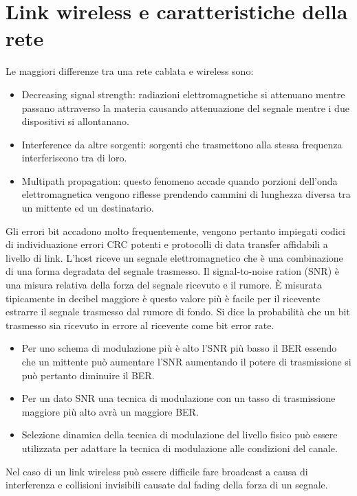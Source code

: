\section{Link wireless e caratteristiche della rete}
Le maggiori differenze tra una rete cablata e wireless sono:
\begin{itemize}
\item Decreasing signal strength: radiazioni elettromagnetiche si attenuano mentre passano attraverso la materia causando attenuazione del segnale mentre i due dispositivi si allontanano.
\item Interference da altre sorgenti: sorgenti che trasmettono alla stessa frequenza interferiscono tra di loro. 
\item Multipath propagation: questo fenomeno accade quando porzioni dell'onda elettromagnetica vengono riflesse prendendo cammini di lunghezza diversa tra un mittente ed un destinatario.
\end{itemize}
Gli errori bit accadono molto frequentemente, vengono pertanto impiegati codici di individuazione errori CRC potenti e protocolli di data transfer affidabili a livello di link. L'host riceve un segnale 
elettromagnetico che \`e una combinazione di una forma degradata del segnale trasmesso. Il signal-to-noise ration (SNR) \`e una misura relativa della forza del segnale ricevuto e il rumore. \`E misurata 
tipicamente in decibel maggiore \`e questo valore pi\`u \`e facile per il ricevente estrarre il segnale trasmesso dal rumore di fondo. Si dice la probabilit\`a che un bit trasmesso sia ricevuto in errore al ricevente
come bit error rate.
\begin{itemize}
\item Per uno schema di modulazione pi\`u \`e alto l'SNR pi\`u basso il BER essendo che un mittente pu\`o aumentare l'SNR aumentando il potere di trasmissione si pu\`o pertanto diminuire il BER. 
\item Per un dato SNR una tecnica di modulazione con un tasso di trasmissione maggiore pi\`u alto avr\`a un maggiore BER. 
\item Selezione dinamica della tecnica di modulazione del livello fisico pu\`o essere utilizzata per adattare la tecnica di modulazione alle condizioni del canale. 
\end{itemize}
Nel caso di un link wireless pu\`o essere difficile fare broadcast a causa di interferenza e collisioni invisibili causate dal fading della forza di un segnale. 
